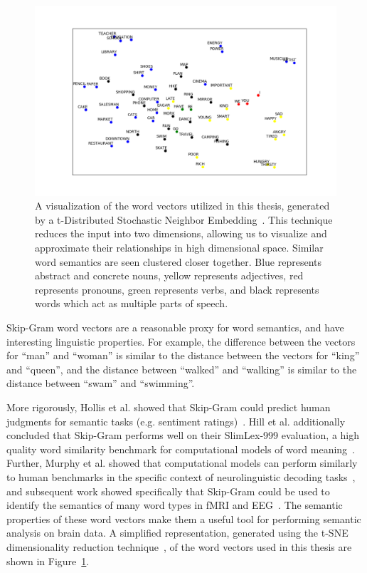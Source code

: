 \begin{figure}[t]
 \centerline{
   \includegraphics[width=\linewidth]{figures/tsne}
 }
 \caption[Visualization of Utilized Word Vectors]{
   A visualization of the word vectors utilized in this thesis, generated by a 
   t-Distributed Stochastic Neighbor Embedding~\cite{maaten2008visualizing}.  
   This technique reduces the input into two dimensions, allowing us to 
   visualize and approximate their relationships in high dimensional space.  
   Similar word semantics are seen clustered closer together. Blue represents 
   abstract and concrete nouns, yellow represents adjectives, red represents 
   pronouns, green represents verbs, and black represents words which act as 
   multiple parts of speech.
 }
 \label{fig:tsne}
\end{figure}

Skip-Gram word vectors are a reasonable proxy for word semantics, and have 
interesting linguistic properties. For example, the difference between the 
vectors for ``man'' and ``woman'' is similar to the distance between the 
vectors for ``king'' and ``queen'', and the distance between ``walked'' and 
``walking'' is similar to the distance between ``swam'' and ``swimming''.

More rigorously, Hollis et al. showed that Skip-Gram could predict human 
judgments for semantic tasks (e.g. sentiment 
ratings)~\cite{hollis2017extrapolating}.  Hill et al.  additionally concluded 
that Skip-Gram performs well on their SlimLex-999 evaluation, a high quality 
word similarity benchmark for computational models of word 
meaning~\cite{hill2016simlex}. Further, Murphy et al. showed that computational 
models can perform similarly to human benchmarks in the specific context of 
neurolinguistic decoding tasks~\cite{Murphy2012}, and subsequent work showed 
specifically that Skip-Gram could be used to identify the semantics of many 
word types in fMRI and EEG~\cite{xu2016brainbench}. The semantic properties of 
these word vectors make them a useful tool for performing semantic analysis on 
brain data. A simplified representation, generated using the t-SNE 
dimensionality reduction technique~\cite{maaten2008visualizing}, of the word 
vectors used in this thesis are shown in Figure~\ref{fig:tsne}.

